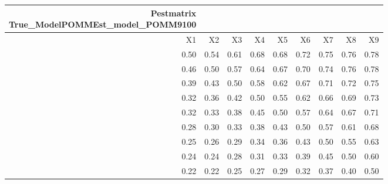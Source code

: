 \begin{longtable}{rrrrrrrrr}
\caption*{
{\large Pestmatrix} \\ 
{\small True\_ModelPOMMEst\_model\_POMM9100}
} \\ 
\toprule
X1 & X2 & X3 & X4 & X5 & X6 & X7 & X8 & X9 \\ 
\midrule
0.50 & 0.54 & 0.61 & 0.68 & 0.68 & 0.72 & 0.75 & 0.76 & 0.78 \\ 
0.46 & 0.50 & 0.57 & 0.64 & 0.67 & 0.70 & 0.74 & 0.76 & 0.78 \\ 
0.39 & 0.43 & 0.50 & 0.58 & 0.62 & 0.67 & 0.71 & 0.72 & 0.75 \\ 
0.32 & 0.36 & 0.42 & 0.50 & 0.55 & 0.62 & 0.66 & 0.69 & 0.73 \\ 
0.32 & 0.33 & 0.38 & 0.45 & 0.50 & 0.57 & 0.64 & 0.67 & 0.71 \\ 
0.28 & 0.30 & 0.33 & 0.38 & 0.43 & 0.50 & 0.57 & 0.61 & 0.68 \\ 
0.25 & 0.26 & 0.29 & 0.34 & 0.36 & 0.43 & 0.50 & 0.55 & 0.63 \\ 
0.24 & 0.24 & 0.28 & 0.31 & 0.33 & 0.39 & 0.45 & 0.50 & 0.60 \\ 
0.22 & 0.22 & 0.25 & 0.27 & 0.29 & 0.32 & 0.37 & 0.40 & 0.50 \\ 
\bottomrule
\end{longtable}

